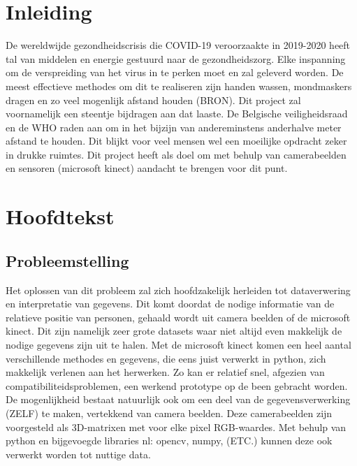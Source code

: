 \documentclass[a4paper,11pt]{article}
\begin{document}
	\begin{abstract}
		
	\end{abstract}
	
	
	
	\tableofcontents
	\newpage
	
	
	
	
	
	
	
	
	\section{Inleiding}
		De wereldwijde gezondheidscrisis die COVID-19 veroorzaakte in 2019-2020 heeft tal van middelen en energie gestuurd naar de gezondheidszorg. Elke inspanning om de verspreiding van het virus in te perken moet en zal geleverd worden. De meest effectieve methodes om dit te realiseren zijn handen wassen, mondmaskers dragen en zo veel mogenlijk afstand houden (BRON). Dit project zal voornamelijk een steentje bijdragen aan dat laaste. De Belgische veiligheidsraad en de WHO raden aan om in het bijzijn van andereminstens anderhalve meter afstand te houden. Dit blijkt voor veel mensen wel een moeilijke opdracht zeker in drukke ruimtes. Dit project heeft als doel om met behulp van camerabeelden en sensoren (microsoft kinect) aandacht te brengen voor dit punt.
		
	\section{Hoofdtekst}
	\subsection{Probleemstelling}
		Het oplossen van dit probleem zal zich hoofdzakelijk herleiden tot dataverwering en interpretatie van gegevens. Dit komt doordat de nodige informatie van de relatieve positie van personen, gehaald wordt uit camera beelden of de microsoft kinect. Dit zijn namelijk zeer grote datasets waar niet altijd even makkelijk de nodige gegevens zijn uit te halen.
		Met de microsoft kinect komen een heel aantal verschillende methodes en gegevens, die eens juist verwerkt in python, zich makkelijk verlenen aan het herwerken. Zo kan er relatief snel, afgezien van compatibiliteidsproblemen, een werkend prototype op de been gebracht worden. De mogenlijkheid bestaat natuurlijk ook om een deel van de gegevensverwerking (ZELF) te maken, vertekkend van camera beelden. Deze camerabeelden zijn voorgesteld als 3D-matrixen met voor elke pixel RGB-waardes. Met behulp van python en bijgevoegde libraries nl: opencv, numpy, (ETC.) kunnen deze ook verwerkt worden tot nuttige data.   
		  
\end{document}
